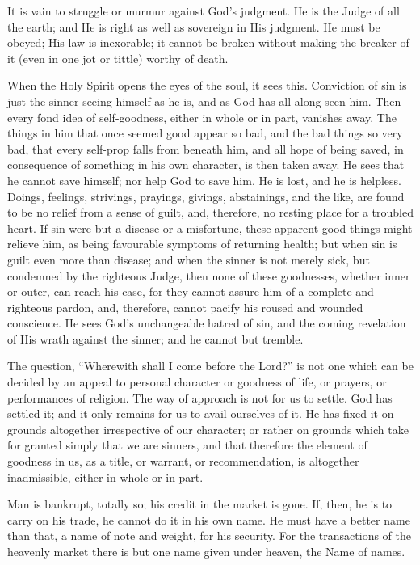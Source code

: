 \documentclass[
]{book}
\begin{document}
It is vain to struggle or murmur against God's judgment. He is the Judge of all the earth; and He is right as well as sovereign in His judgment. He must be obeyed; His law is inexorable; it cannot be broken without making the breaker of it (even in one jot or tittle) worthy of death.

When the Holy Spirit opens the eyes of the soul, it sees this. Conviction of sin is just the sinner seeing himself as he is, and as God has all along seen him. Then every fond idea of self-goodness, either in whole or in part, vanishes away. The things in him that once seemed good appear so bad, and the bad things so very bad, that every self-prop falls from beneath him, and all hope of being saved, in consequence of something in his own character, is then taken away. He sees that he cannot save himself; nor help God to save him. He is lost, and he is helpless. Doings, feelings, strivings, prayings, givings, abstainings, and the like, are found to be no relief from a sense of guilt, and, therefore, no resting place for a troubled heart. If sin were but a disease or a misfortune, these apparent good things might relieve him, as being favourable symptoms of returning health; but when sin is guilt even more than disease; and when the sinner is not merely sick, but condemned by the righteous Judge, then none of these goodnesses, whether inner or outer, can reach his case, for they cannot assure him of a complete and righteous pardon, and, therefore, cannot pacify his roused and wounded conscience. He sees God's unchangeable hatred of sin, and the coming revelation of His wrath against the sinner; and he cannot but tremble.

The question, ``Wherewith shall I come before the Lord?'' is not one which can be decided by an appeal to personal character or goodness of life, or prayers, or performances of religion. The way of approach is not for us to settle. God has settled it; and it only remains for us to avail ourselves of it. He has fixed it on grounds altogether irrespective of our character; or rather on grounds which take for granted simply that we are sinners, and that therefore the element of goodness in us, as a title, or warrant, or recommendation, is altogether inadmissible, either in whole or in part.

Man is bankrupt, totally so; his credit in the market is gone. If, then, he is to carry on his trade, he cannot do it in his own name. He must have a better name than that, a name of note and weight, for his security. For the transactions of the heavenly market there is but one name given under heaven, the Name of names.
\end{document}
